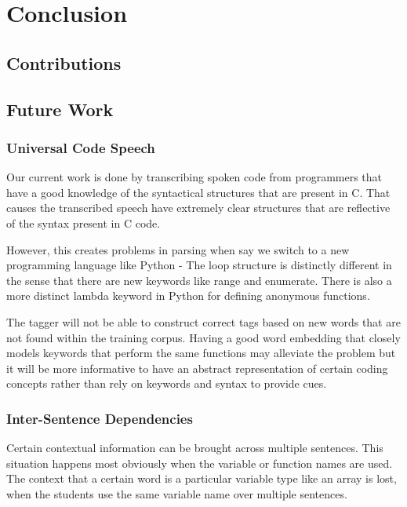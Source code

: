 \documentclass[fyp]{socreport}
\begin{document}

\chapter{Conclusion}

\section{Contributions}


\section{Future Work}

\subsection{Universal Code Speech}
Our current work is done by transcribing spoken code from programmers that have
a good knowledge of the syntactical structures that are present in C. That
causes the transcribed speech have extremely clear structures that are
reflective of the syntax present in C code.

However, this creates problems in parsing when say we switch to a new
programming language like Python - The loop structure is distinctly different
in the sense that there are new keywords like range and enumerate. There is
also a more distinct lambda keyword in Python for defining anonymous functions.

The tagger will not be able to construct correct tags based on new words that
are not found within the training corpus. Having a good word embedding that
closely models keywords that perform the same functions may alleviate the problem
but it will be more informative to have an abstract representation of certain
coding concepts rather than rely on keywords and syntax to provide cues.


\subsection{Inter-Sentence Dependencies}
Certain contextual information can be brought across multiple sentences. This
situation happens most obviously when the variable or function names are used.
The context that a certain word is a particular variable type like an array is
lost, when the students use the same variable name over multiple sentences.
\end{document}
